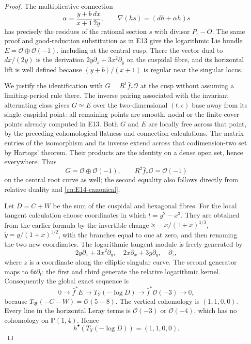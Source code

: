 \begin{proof}
The multiplicative connection
\[
 \alpha=\frac{y+b}{x+1}\frac{dx}{2y},\qquad
 \nabla(hs)=(dh+\alpha h)s
\]
has precisely the residues of the rational section $s$ with divisor
$P_\epsilon-O$. The same proof and good-reduction substitution as
in E13 give the logarithmic Lie bundle
$E=\mathcal O\oplus\mathcal O(-1)$, including at the central
cusp. There the vector dual to $dx/(2y)$ is the derivation
$2y\partial_x+3x^2\partial_y$ on the cuspidal fibre, and its
horizontal lift is well defined because
$(y+b)/(x+1)$ is regular near the singular locus.

We justify the identification with $G=R^1\bar f_*\mathcal O$
at the cusp without assuming a limiting-period rule there.
The inverse pairing associated with the invariant alternating
class gives $G\simeq E$ over the two-dimensional $(t,\epsilon)$
base away from its single cuspidal point: all remaining points
are smooth, nodal or the finite-cover points already computed in
E13. Both $G$ and $E$ are locally free across that point, by the
preceding cohomological-flatness and connection calculations.
The matrix entries of the isomorphism and its inverse extend
across that codimension-two set by Hartogs' theorem. Their products
are the identity on a dense open set, hence everywhere. Thus
\[
 G=\mathcal O\oplus\mathcal O(-1),\qquad
 R^2\bar f_*\mathcal O=\mathcal O(-1)
\]
on the central root curve as well; the second equality also follows
directly from relative duality and \eqref{eq:E14-canonical}.

Let $D=C+W$ be the sum of the cuspidal and hexagonal fibres.
For the local tangent calculation choose coordinates in which
$t=y^2-x^3$. They are obtained from the earlier formula by the
invertible change $\widetilde x=x/(1+x)^{1/3}$,
$\widetilde y=y/(1+x)^{1/2}$, with the branches equal to one at
zero, and then renaming the two new coordinates. The logarithmic
tangent module is freely generated by
\[
 2y\partial_x+3x^2\partial_y,\quad
 2x\partial_x+3y\partial_y,\quad\partial_z,
\]
where $z$ is a coordinate along the elliptic singular curve. The
second generator maps to $6t\partial_t$;
the first and third generate the relative logarithmic kernel.
Consequently the global exact sequence is
\[
 0\longrightarrow\bar f^*E\longrightarrow T_Y(-\log D)
 \longrightarrow\bar f^*\mathcal O(-3)\longrightarrow0,
\]
because $T_{\mathfrak B}(-C-W)=\mathcal O(5-8)$.
The vertical cohomology is $(1,1,0,0)$. Every line in the
horizontal Leray terms is $\mathcal O(-3)$ or $\mathcal O(-4)$,
which has no cohomology on $\mathbb P(1,4)$. Hence
\begin{equation}\label{eq:E14-log-coho}
 h^\bullet(T_Y(-\log D))=(1,1,0,0).
\end{equation}


\end{proof}
